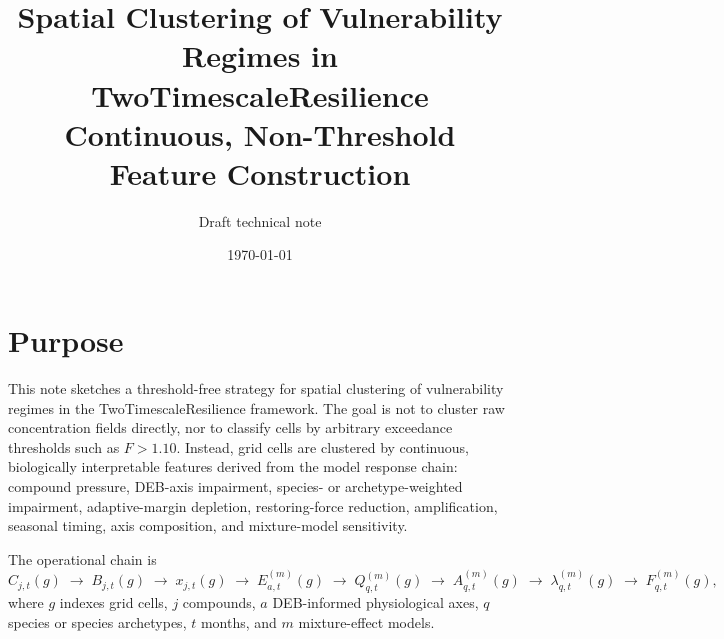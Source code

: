 \documentclass[11pt]{article}
\title{Spatial Clustering of Vulnerability Regimes in TwoTimescaleResilience\\
\large Continuous, Non-Threshold Feature Construction}
\author{Draft technical note}
\date{\today}
\begin{document}
\maketitle

\section{Purpose}
This note sketches a threshold-free strategy for spatial clustering of vulnerability regimes in the
TwoTimescaleResilience framework. The goal is not to cluster raw concentration fields directly, nor to
classify cells by arbitrary exceedance thresholds such as $F>1.10$. Instead, grid cells are clustered by
continuous, biologically interpretable features derived from the model response chain: compound pressure,
DEB-axis impairment, species- or archetype-weighted impairment, adaptive-margin depletion, restoring-force
reduction, amplification, seasonal timing, axis composition, and mixture-model sensitivity.

The operational chain is
\begin{equation}
C_{j,t}(g) \;\longrightarrow\; B_{j,t}(g) \;\longrightarrow\; x_{j,t}(g)
\;\longrightarrow\; E_{a,t}^{(m)}(g)
\;\longrightarrow\; Q_{q,t}^{(m)}(g)
\;\longrightarrow\; A_{q,t}^{(m)}(g)
\;\longrightarrow\; \lambda_{q,t}^{(m)}(g)
\;\longrightarrow\; F_{q,t}^{(m)}(g),
\end{equation}
where $g$ indexes grid cells, $j$ compounds, $a$ DEB-informed physiological axes,
$q$ species or species archetypes, $t$ months, and $m$ mixture-effect models.
\end{document}
